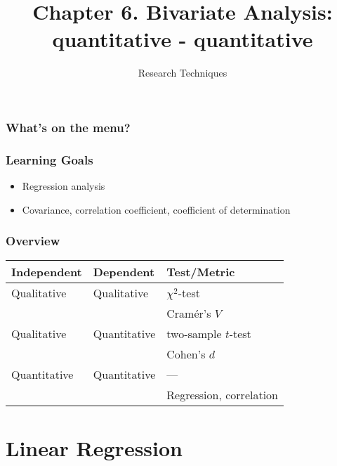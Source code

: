 \documentclass[aspectratio=169]{beamer}
\title{Chapter 6. Bivariate Analysis: quantitative - quantitative}
\subtitle{Research Techniques}
\begin{document}
\begin{frame}
  \maketitle
\end{frame}

\begin{frame}
  \frametitle{What's on the menu?}
  
  \tableofcontents
\end{frame}

\begin{frame}
  \frametitle{Learning Goals}
  
  \begin{itemize}
    \item Regression analysis
    \item Covariance, correlation coefficient, coefficient of determination
  \end{itemize}
\end{frame}

\begin{frame}
  \frametitle{Overview}
    \centering
    \begin{tabular}{lll}
    	\toprule
    	\textbf{Independent}    & \textbf{Dependent}    & \textbf{Test/Metric}          \\
    	\midrule
      Qualitative             & Qualitative           & $\chi^2$-test                 \\
                              &                       & Cramér's $V$                  \\
      Qualitative             & Quantitative          & two-sample $t$-test           \\
    	                        &                       & Cohen's $d$                   \\
      Quantitative            & Quantitative          & ---                           \\
    	                        &                       & Regression, correlation       \\
    	\bottomrule
    \end{tabular}
\end{frame}

\section{Linear Regression}
\end{document}
